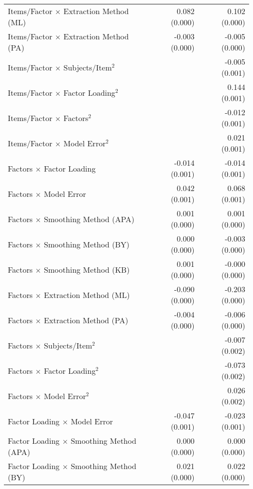 \documentclass[
  english,
  man]{apa6}
\begin{document}
\begin{center}
\begin{longtable}{l D{)}{)}{11)0} D{)}{)}{11)0}}
Items/Factor $\times$ Extraction Method (ML)           & 0.082 \; (0.000)  & 0.102 \; (0.000)  \\
Items/Factor $\times$ Extraction Method (PA)           & -0.003 \; (0.000) & -0.005 \; (0.000) \\
Items/Factor $\times$ Subjects/Item$^2$                &                   & -0.005 \; (0.001) \\
Items/Factor $\times$ Factor Loading$^2$               &                   & 0.144 \; (0.001)  \\
Items/Factor $\times$ Factors$^2$                      &                   & -0.012 \; (0.001) \\
Items/Factor $\times$ Model Error$^2$                  &                   & 0.021 \; (0.001)  \\
Factors $\times$ Factor Loading                        & -0.014 \; (0.001) & -0.014 \; (0.001) \\
Factors $\times$ Model Error                           & 0.042 \; (0.001)  & 0.068 \; (0.001)  \\
Factors $\times$ Smoothing Method (APA)                & 0.001 \; (0.000)  & 0.001 \; (0.000)  \\
Factors $\times$ Smoothing Method (BY)                 & 0.000 \; (0.000)  & -0.003 \; (0.000) \\
Factors $\times$ Smoothing Method (KB)                 & 0.001 \; (0.000)  & -0.000 \; (0.000) \\
Factors $\times$ Extraction Method (ML)                & -0.090 \; (0.000) & -0.203 \; (0.000) \\
Factors $\times$ Extraction Method (PA)                & -0.004 \; (0.000) & -0.006 \; (0.000) \\
Factors $\times$ Subjects/Item$^2$                     &                   & -0.007 \; (0.002) \\
Factors $\times$ Factor Loading$^2$                    &                   & -0.073 \; (0.002) \\
Factors $\times$ Model Error$^2$                       &                   & 0.026 \; (0.002)  \\
Factor Loading $\times$ Model Error                    & -0.047 \; (0.001) & -0.023 \; (0.001) \\
Factor Loading $\times$ Smoothing Method (APA)         & 0.000 \; (0.000)  & 0.000 \; (0.000)  \\
Factor Loading $\times$ Smoothing Method (BY)          & 0.021 \; (0.000)  & 0.022 \; (0.000)  \\

\end{longtable}
\end{center}
\end{document}
